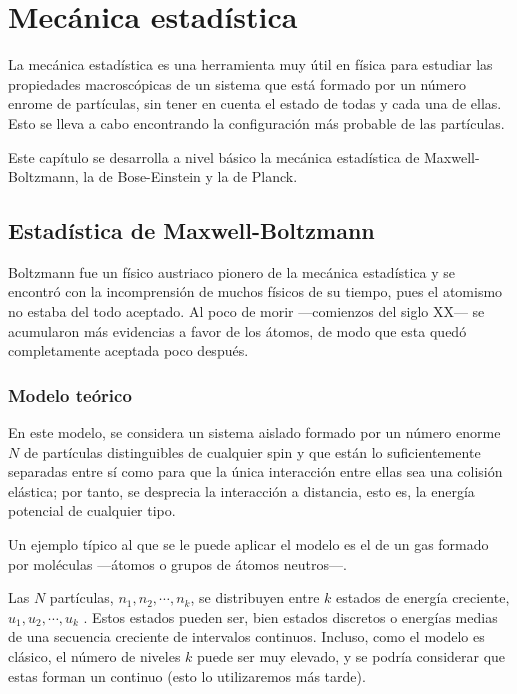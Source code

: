 %

\chapter{Mecánica estadística}
La mecánica estadística es una herramienta muy útil en física para estudiar
las propiedades macroscópicas de un sistema que está formado por un número
enrome de partículas, sin tener en cuenta el estado de todas y cada una de
ellas. Esto se lleva a cabo encontrando la configuración más probable de
las partículas.

Este capítulo se desarrolla a nivel básico la mecánica estadística
de Maxwell-Boltzmann, la de Bose-Einstein y la de Planck.

\section{Estadística de Maxwell-Boltzmann}
Boltzmann fue un físico austriaco pionero de la mecánica estadística y se
encontró con la incomprensión de muchos físicos de su tiempo, pues el
atomismo no estaba del todo aceptado. Al poco de morir ---comienzos del siglo
XX--- se acumularon más evidencias a favor de los átomos, de modo que esta
quedó completamente aceptada poco después.

\subsection{Modelo teórico}
En este modelo, se considera un sistema aislado formado por un número enorme
$N$ de partículas distinguibles de cualquier spin y que están lo
suficientemente separadas entre sí como para que la única interacción entre
ellas sea una colisión elástica; por tanto, se desprecia la interacción a
distancia, esto es, la energía potencial de cualquier tipo.

Un ejemplo típico al que se le puede aplicar el modelo es el de un gas formado
por moléculas ---átomos o grupos de átomos neutros---.

Las $N$ partículas, $n_1, n_2, \cdots, n_k$, se distribuyen entre $k$ estados
de energía creciente,  $u_1, u_2, \cdots, u_k$ . Estos estados pueden ser,
bien estados discretos o energías medias de una secuencia creciente de
intervalos continuos. Incluso, como el modelo es clásico, el número de niveles
$k$ puede ser muy elevado, y se podría considerar que estas forman un
continuo (esto lo utilizaremos más tarde).

